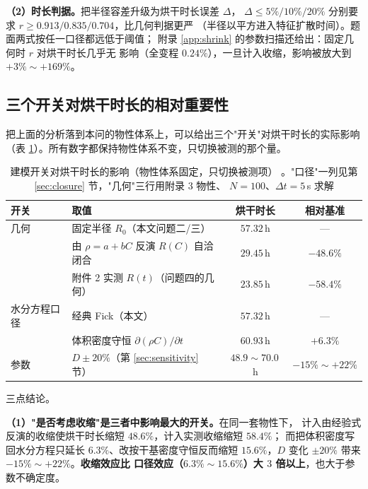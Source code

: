 \documentclass[12pt,a4paper,fontset=none]{ctexart}
\begin{document}
\textbf{（2）时长判据。}把半径容差升级为烘干时长误差 $\Delta$，
$\Delta\le5\%/10\%/20\%$ 分别要求 $r\ge0.913/0.835/0.704$，比几何判据更严
（半径以平方进入特征扩散时间）。题面两式按任一口径都远低于阈值；
附录 \ref{app:shrink} 的参数扫描还给出：固定几何时 $r$ 对烘干时长几乎无
影响（全变程 $0.24\%$），一旦计入收缩，影响被放大到 $+3\%\sim+169\%$。

\subsection{三个开关对烘干时长的相对重要性}

把上面的分析落到本问的物性体系上，可以给出三个"开关"对烘干时长的实际影响
（表 \ref{tab:p11-geom}）。所有数字都保持物性体系不变，只切换被测的那个量。

\begin{table}[htbp]
  \centering
  \caption{建模开关对烘干时长的影响（物性体系固定，只切换被测项）
    。"口径"一列见第 \ref{sec:closure} 节，"几何"三行用附录 3 物性、
    $N=100$、$\Delta t=5$\,s 求解}
  \label{tab:p11-geom}
  \small
  \begin{tabular}{llcc}
    \toprule
    开关 & 取值 & 烘干时长 & 相对基准 \\
    \midrule
    几何 & 固定半径 $R_0$（本文问题二/三） & $57.32$\,h & --- \\
         & 由 $\rho=a+bC$ 反演 $R(C)$ 自洽闭合 & $29.45$\,h & $-48.6\%$ \\
         & 附件 2 实测 $R(t)$（问题四的几何） & $23.85$\,h & $-58.4\%$ \\
    \midrule
    水分方程口径 & 经典 Fick（本文） & $57.32$\,h & --- \\
                 & 体积密度守恒 $\partial(\rho C)/\partial t$ & $60.93$\,h
      & $+6.3\%$ \\
    \midrule
    参数 & $D\pm20\%$（第 \ref{sec:sensitivity} 节） & $48.9\sim70.0$\,h
      & $-15\%\sim+22\%$ \\
    \bottomrule
  \end{tabular}
\end{table}

三点结论。

\textbf{（1）"是否考虑收缩"是三者中影响最大的开关。}在同一套物性下，
计入由经验式反演的收缩使烘干时长缩短 $48.6\%$，计入实测收缩缩短 $58.4\%$；
而把体积密度写回水分方程只延长 $6.3\%$、改按干基密度守恒反而缩短
$15.6\%$，$D$ 变化 $\pm20\%$ 带来 $-15\%\sim+22\%$。\textbf{收缩效应比
口径效应（$6.3\%\sim15.6\%$）大 $3$ 倍以上}，也大于参数不确定度。
\end{document}
